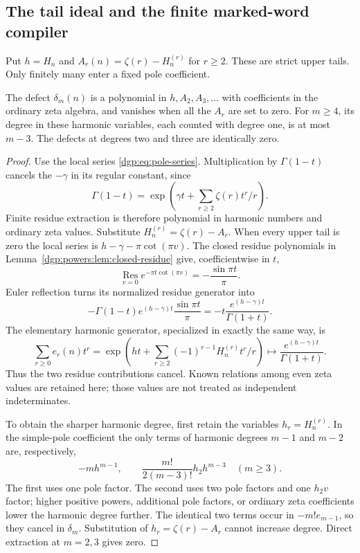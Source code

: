 \subsection{The tail ideal and the finite marked-word compiler}

Put $h=H_n$ and $A_r(n)=\zeta(r)-H_n^{(r)}$ for $r\ge2$.
These are strict upper tails.  Only finitely many enter a fixed pole
coefficient.

\begin{lemma}
\label{gat:tailideal}
The defect $\delta_m(n)$ is a polynomial in $h,A_2,A_3,\ldots$
with coefficients in the ordinary zeta algebra, and vanishes when
all the $A_r$ are set to zero.  For $m\ge4$, its degree in these
harmonic variables, each counted with degree one, is at most $m-3$.
The defects at degrees two and three are identically zero.
\end{lemma}

\begin{proof}
Use the local series \eqref{dgp:eq:pole-series}.  Multiplication by
$\Gamma(1-t)$ cancels the $-\gamma$ in its regular constant, since
\[
 \Gamma(1-t)=\exp\left(\gamma t+\sum_{r\ge2}\zeta(r)t^r/r\right).
\]
Finite residue extraction is therefore polynomial in harmonic numbers
and ordinary zeta values.  Substitute $H_n^{(r)}=\zeta(r)-A_r$.
When every upper tail is zero the local series is
$h-\gamma-\pi\cot(\pi v)$.  The closed residue polynomials in
Lemma~\ref{dgp:powers:lem:closed-residue} give, coefficientwise in $t$,
\[
 \operatorname*{Res}_{v=0}e^{-\pi t\cot(\pi v)}
                   =-\frac{\sin\pi t}{\pi}.
\]
Euler reflection turns its normalized residue generator into
\[
 -\Gamma(1-t)e^{(h-\gamma)t}\frac{\sin\pi t}{\pi}
             =-t\frac{e^{(h-\gamma)t}}{\Gamma(1+t)}.
\]
The elementary harmonic generator, specialized in exactly the same way,
is
\[
 \sum_{r\ge0}e_r(n)t^r
  =\exp\left(ht+\sum_{r\ge2}(-1)^{r-1}H_n^{(r)}t^r/r\right)
  \longmapsto\frac{e^{(h-\gamma)t}}{\Gamma(1+t)}.
\]
Thus the two residue contributions cancel.  Known relations among
even zeta values are retained here; those values are not treated as
independent indeterminates.

To obtain the sharper harmonic degree, first retain the variables
$h_r=H_n^{(r)}$.  In the simple-pole coefficient the only terms of
harmonic degrees $m-1$ and $m-2$ are, respectively,
\[
 -m h^{m-1},\qquad
 \frac{m!}{2(m-3)!}h_2 h^{m-3}\quad(m\ge3).
\]
The first uses one pole factor.  The second uses two pole factors and
one $h_2v$ factor; higher positive powers, additional pole factors,
or ordinary zeta coefficients lower the harmonic degree further.
The identical two terms occur in $-m!e_{m-1}$, so they cancel in
$\delta_m$.  Substitution of $h_r=\zeta(r)-A_r$ cannot increase
degree.  Direct extraction at $m=2,3$ gives zero.
\end{proof}


